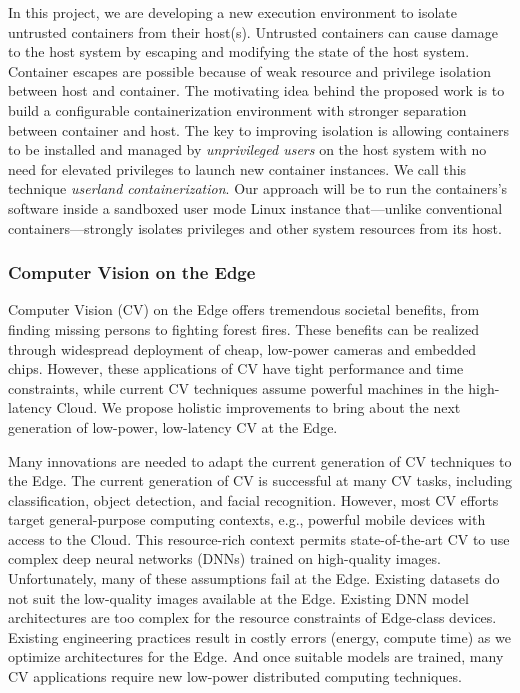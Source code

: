\documentclass[10pt,onecolumn]{article}
\begin{document}
In this project, we are  developing a new execution environment to isolate untrusted containers from their host(s).
Untrusted containers can cause damage to the host system by escaping and modifying the state of the host system.
Container escapes are possible because of weak resource and privilege isolation between host and container.
The motivating idea behind the proposed work is to build a configurable containerization environment with stronger separation between container and host.
The key to improving isolation is allowing containers to be installed and managed by \emph{unprivileged users} on the host system with no need for elevated privileges to launch new container instances.
We call this technique \emph{userland containerization}.
Our approach will be to run the containers's software inside a sandboxed user mode Linux instance that---unlike conventional containers---strongly isolates privileges and other system resources from its host.%


\subsubsection{Computer Vision on the Edge}


Computer Vision (CV) on the Edge offers tremendous societal benefits, from finding missing persons to fighting forest fires.
These benefits can be realized through widespread deployment of cheap, low-power cameras and embedded chips.
However, these applications of CV have tight performance and time constraints, while current CV techniques assume powerful machines in the high-latency Cloud.
We propose holistic improvements to bring about the next generation of low-power, low-latency CV at the Edge.

Many innovations are needed to adapt the current generation of CV techniques to the Edge.
The current generation of CV is successful at many CV tasks, including classification, object detection, and facial recognition.
However, most CV efforts target general-purpose computing contexts, e.g., powerful mobile devices with access to the Cloud.
This resource-rich context permits state-of-the-art CV to use complex deep neural networks (DNNs) trained on high-quality images.
Unfortunately, many of these assumptions fail at the Edge.
Existing datasets do not suit the low-quality images available at the Edge.
Existing DNN model architectures are too complex for the resource constraints of Edge-class devices.
Existing engineering practices result in costly errors (energy, compute time) as we optimize architectures for the Edge.
And once suitable models are trained, many CV applications require new low-power distributed computing techniques.
\end{document}
